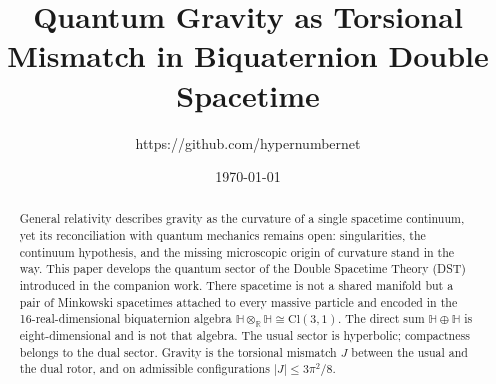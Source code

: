 \documentclass[a4paper]{article}
\title{Quantum Gravity as Torsional Mismatch in Biquaternion Double Spacetime}
\author{https://github.com/hypernumbernet}
\date{\today}
\begin{document}
\maketitle

\begin{abstract}
General relativity describes gravity as the curvature of a single spacetime continuum, yet its reconciliation with quantum mechanics remains open: singularities, the continuum hypothesis, and the missing microscopic origin of curvature stand in the way. This paper develops the quantum sector of the Double Spacetime Theory (DST) introduced in the companion work. There spacetime is not a shared manifold but a pair of Minkowski spacetimes attached to every massive particle and encoded in the 16-real-dimensional biquaternion algebra $\mathbb{H} \otimes_{\mathbb{R}} \mathbb{H} \cong \mathrm{Cl}(3,1)$. The direct sum $\mathbb{H}\oplus\mathbb{H}$ is eight-dimensional and is not that algebra. The usual sector is hyperbolic; compactness belongs to the dual sector. Gravity is the torsional mismatch $J$ between the usual and the dual rotor, and on admissible configurations $|J|\le 3\pi^2/8$.


\end{abstract}
\end{document}

